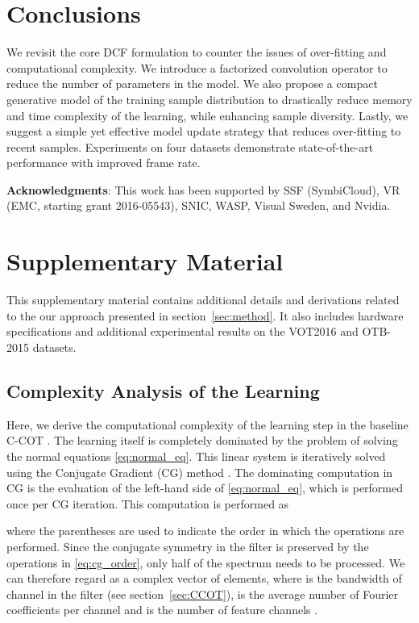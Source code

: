 \documentclass[10pt,twocolumn,letterpaper]{article}
\begin{document}
\section{Conclusions} 
We revisit the core DCF formulation to counter the issues of over-fitting and computational complexity. 
We introduce a factorized convolution operator to reduce the number of parameters in the model. We also propose a compact generative model of the training sample distribution to drastically reduce memory and time complexity of the learning, while enhancing sample diversity. Lastly, we suggest a simple yet effective model update strategy that reduces over-fitting to recent samples. Experiments on four datasets demonstrate state-of-the-art performance with improved frame rate. 

\noindent\textbf{Acknowledgments}:
This work has been supported by SSF (SymbiCloud), VR (EMC, starting grant 2016-05543), SNIC, WASP, Visual Sweden, and Nvidia. 

{\small


}

\clearpage


\section*{Supplementary Material}

This supplementary material contains additional details and derivations related to the our approach presented in section~\ref{sec:method}. It also includes hardware specifications and additional experimental results on the VOT2016 and OTB-2015 datasets.

\subsection*{Complexity Analysis of the Learning}
\label{sec:supp_complexity}

Here, we derive the computational complexity of the learning step in the baseline C-COT \cite{DanelljanECCV2016}. The learning itself is completely dominated by the problem of solving the normal equations \eqref{eq:normal_eq}.
This linear system is iteratively solved using the Conjugate Gradient (CG) method \cite{NumericalOptimization,CGpain}. The dominating computation in CG is the evaluation of the left-hand side of \eqref{eq:normal_eq}, which is performed once per CG iteration. This computation is performed as

where the parentheses are used to indicate the order in which the operations are performed. Since the conjugate symmetry in the filter  is preserved by the operations in \eqref{eq:cg_order}, only half of the spectrum needs to be processed. We can therefore regard  as a complex vector of  elements, where  is the bandwidth of channel  in the filter (see section~\ref{sec:CCOT}),  is the average number of Fourier coefficients per channel and  is the number of feature channels .
\end{document}
